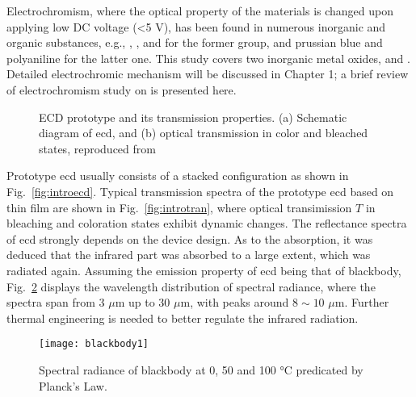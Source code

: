 Electrochromism, where the optical property of the materials is changed upon applying low DC voltage (\textless 5 V), has been found in numerous inorganic and organic substances, e.g., , , and  for the former group, and prussian blue and polyaniline for the latter one. This study covers two inorganic metal oxides,  and . Detailed electrochromic mechanism will be discussed in Chapter 1; a brief review of electrochromism study on  is presented here. 
\begin{figure}[htb]
\centering
{}\hspace{0.04\textwidth}
\caption[ECD prototype and its transmission properties]{ECD prototype and its transmission properties. (a) Schematic diagram of \gls{ecd}, and (b) optical transmission in color and bleached states, reproduced from \cite{Lampert1998}}
\label{fig:introec}
\end{figure}

Prototype \gls{ecd} usually consists of a stacked configuration as shown in Fig.~\ref{fig:introecd}. Typical transmission spectra of the prototype \gls{ecd} based on  thin film are shown in Fig.~\ref{fig:introtran},\cite{Lampert1998} where optical transimission $T$ in bleaching and coloration states exhibit dynamic changes. The reflectance spectra of  \gls{ecd} strongly depends on the device design.\cite{OBrien1999} As to the absorption, it was deduced that the infrared part was absorbed to a large extent, which was radiated again. Assuming the emission property of \gls{ecd} being that of blackbody, Fig.~\ref{fig:introbb} displays the wavelength distribution of spectral radiance, where the spectra span from 3 $\mu$m up to 30 $\mu$m, with peaks around $8\sim10$ $\mu$m. Further thermal engineering is needed to better regulate the infrared radiation. 

\begin{figure}[htb]
\centering
\texttt{[image: blackbody1]}
\caption[Spectral radiance of blackbody at 0, 50 and 100 \si{\degreeCelsius} predicated by Planck's Law]{Spectral radiance of blackbody at 0, 50 and 100 \si{\degreeCelsius} predicated by Planck's Law.}
\label{fig:introbb}
\end{figure}

